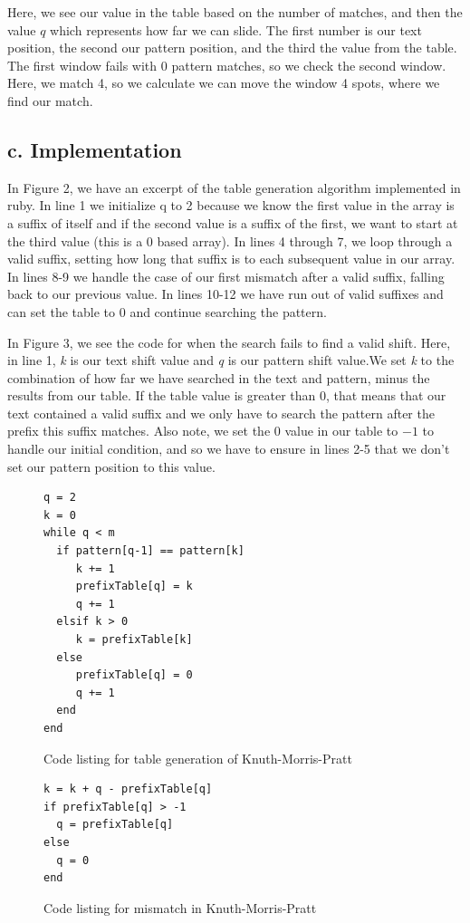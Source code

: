 \documentclass{chi2005}
\begin{document}
Here, we see our value in the table based on the number of matches, and then the value $q$ which represents how far we can slide. The first number is our text position, the second our pattern position, and the third the value from the table. The first window fails with 0 pattern matches, so we check the second window. Here, we match 4, so we calculate we can move the window 4 spots, where we find our match.

\subsection{c. Implementation}

In Figure 2, we have an excerpt of the table generation algorithm implemented in ruby. In line 1 we initialize q to 2 because we know the first value in the array is a suffix of itself and if the second value is a suffix of the first, we want to start at the third value (this is a 0 based array).  In lines 4 through 7, we loop through a valid suffix, setting how long that suffix is to each subsequent value in our array. In lines 8-9 we handle the case of our first mismatch after a valid suffix, falling back to our previous value. In lines 10-12 we have run out of valid suffixes and can set the table to 0 and continue searching the pattern.

In Figure 3, we see the code for when the search fails to find a valid shift. Here, in line 1, \emph{k} is our text shift value and \emph{q} is our pattern shift value.We set \emph{k}  to the combination of how far we have searched in the text and pattern, minus the results from our table. If the table value is greater than 0, that means that our text contained a valid suffix and we only have to search the pattern after the prefix this suffix matches. Also note, we set the 0 value in our table to $-1$ to handle our initial condition, and so we have to ensure in lines 2-5 that we don't set our pattern position to this value.

\begin{figure}
\begin{lstlisting}
q = 2
k = 0
while q < m
  if pattern[q-1] == pattern[k]
     k += 1
     prefixTable[q] = k
     q += 1
  elsif k > 0
     k = prefixTable[k]
  else
     prefixTable[q] = 0
     q += 1
  end
end
\end{lstlisting}
\caption{Code listing for table generation of Knuth-Morris-Pratt}
\label{figure2}
\end{figure}

\begin{figure}
\begin{lstlisting}
k = k + q - prefixTable[q]
if prefixTable[q] > -1
  q = prefixTable[q]
else
  q = 0
end
\end{lstlisting}
\caption{Code listing for mismatch in Knuth-Morris-Pratt}
\label{figure3}
\end{figure}
\end{document}
